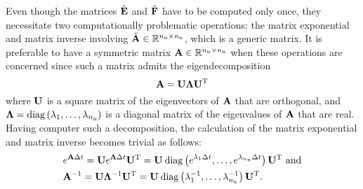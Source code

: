 Even though the matrices $\tilde{\mathbf{E}}$ and $\tilde{\mathbf{F}}$ have to be computed only once,
they necessitate two computationally problematic operations: the matrix
exponential and matrix inverse involving $\tilde{\mathbf{A}} \in \mathbb{R}^{{n_\mathrm{n}} \times {n_\mathrm{n}}}$,
which is a generic matrix. It is preferable to have a symmetric matrix $\mathbf{A}
\in \mathbb{R}^{{n_\mathrm{n}} \times {n_\mathrm{n}}}$ when these operations are concerned since such a
matrix admits the eigendecomposition \cite{press2007}
\begin{equation} \elab{eigendecomposition}
  \m{A} = \m{U} \m{\Lambda} \transpose{\m{U}}
\end{equation}
where $\mathbf{U}$ is a square matrix of the eigenvectors of $\mathbf{A}$ that are
orthogonal, and $\mathbf{\Lambda} = \mathrm{diag}\left(\lambda_1, \dots, \lambda_{n_\mathrm{n}}\right)$ is a diagonal
matrix of the eigenvalues of $\mathbf{A}$ that are real. Having computer such a
decomposition, the calculation of the matrix exponential and matrix inverse
becomes trivial as follows:
\begin{align}
  & e^{\m{A} \dt}
  = \m{U} e^{\m{\Lambda} \dt} \transpose{\m{U}}
  = \m{U} \: \diagonal{e^{\lambda_1 \dt}}{e^{\lambda_\nn \dt}} \transpose{\m{U}} \text{ and} \elab{matrix-exponential} \\
  & \m{A}^{-1}
  = \m{U} \m{\Lambda}^{-1} \transpose{\m{U}}
  = \m{U} \: \diagonal{\lambda_1^{-1}}{\lambda_\nn^{-1}} \transpose{\m{U}}. \nonumber
\end{align}

